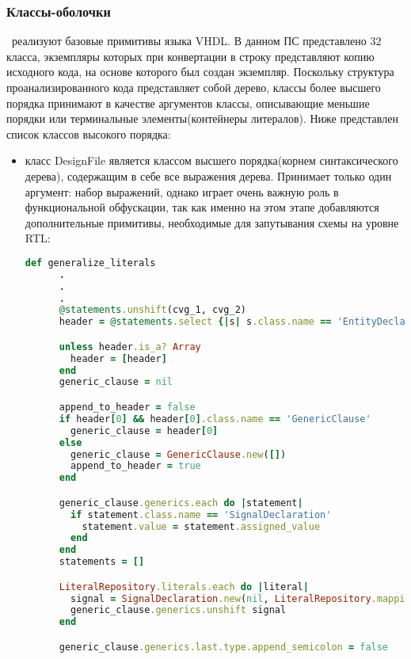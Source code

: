 \subsubsection{Классы-оболочки}~реализуют базовые примитивы языка VHDL. В данном ПС представлено 32 класса, экземпляры которых при конвертации в строку представляют копию исходного кода, на основе которого был создан экземпляр. Поскольку структура проанализированного кода представляет собой дерево, классы более высшего порядка принимают в качестве аргументов классы, описывающие меньшие порядки или терминальные элементы(контейнеры литералов). Ниже представлен список классов высокого порядка:
\begin{itemize}
\item класс DesignFile является классом высшего порядка(корнем синтаксического дерева), содержащим в себе все выражения дерева. Принимает только один аргумент: набор выражений, однако играет очень важную роль в функциональной обфускации, так как именно на этом этапе добавляются дополнительные примитивы, необходимые для запутывания схемы на  уровне RTL:
  \begin{lstlisting}[language=Ruby, style=rubystyle,caption={Добавление дополнительных компонентов для функциональной обфускации}, label=lst:arch_and_mod:design_functional_obf]
    def generalize_literals
      .
      .
      .
      @statements.unshift(cvg_1, cvg_2)
      header = @statements.select {|s| s.class.name == 'EntityDeclaration'}[0].header

      unless header.is_a? Array
        header = [header]
      end
      generic_clause = nil

      append_to_header = false
      if header[0] && header[0].class.name == 'GenericClause'
        generic_clause = header[0]
      else
        generic_clause = GenericClause.new([])
        append_to_header = true
      end

      generic_clause.generics.each do |statement|
        if statement.class.name == 'SignalDeclaration'
          statement.value = statement.assigned_value
        end
      end
      statements = []

      LiteralRepository.literals.each do |literal|
        signal = SignalDeclaration.new(nil, LiteralRepository.mapping_for(literal.stringified), nil, TypeWrapper.new(literal.type, nil, true), literal.stringified)
        generic_clause.generics.unshift signal
      end

      generic_clause.generics.last.type.append_semicolon = false


\end{lstlisting}
\end{itemize}
